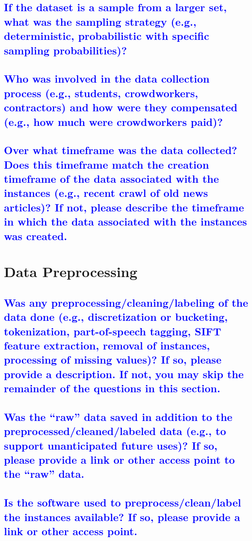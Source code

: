 \documentclass[letterpaper, 10 pt, conference]{ieeeconf}  %
\begin{document}
\textcolor{blue}{\subsection{If the dataset is a sample from a larger set, what was the sampling strategy (e.g., deterministic, probabilistic with specific sampling probabilities)?}}
\lipsum[1]

\textcolor{blue}{\subsection{Who was involved in the data collection process (e.g., students,
crowdworkers, contractors) and how were they compensated (e.g.,
how much were crowdworkers paid)?}}
\lipsum[1]

\textcolor{blue}{\subsection{Over what timeframe was the data collected? Does this timeframe
match the creation timeframe of the data associated with the instances
(e.g., recent crawl of old news articles)? If not, please describe the timeframe in which the data associated with the instances was created.}}
\lipsum[1]

\section{Data Preprocessing}

\textcolor{blue}{\subsection{Was any preprocessing/cleaning/labeling of the data done (e.g., discretization or bucketing, tokenization, part-of-speech tagging, SIFT
feature extraction, removal of instances, processing of missing values)? If so, please provide a description. If not, you may skip the remainder of the questions in this section.}}
\lipsum[1]


\textcolor{blue}{\subsection{Was the “raw” data saved in addition to the preprocessed/cleaned/labeled data (e.g., to support unanticipated
future uses)? If so, please provide a link or other access point to the
“raw” data.}}
\lipsum[1]

\textcolor{blue}{\subsection{Is the software used to preprocess/clean/label the instances available? If so, please provide a link or other access point.}}
\lipsum[1]
\end{document}
